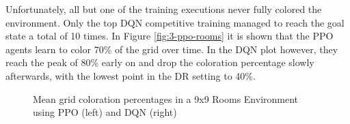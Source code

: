 Unfortunately, all but one of the training executions never fully colored the environment. Only the top DQN competitive training managed to reach the goal state a total of 10 times. In Figure \ref{fig:3-ppo-rooms} it is shown that the PPO agents learn to color 70\% of the grid over time. In the DQN plot however, they reach the peak of 80\% early on and drop the coloration percentage slowly afterwards, with the lowest point in the DR setting to 40\%.  

\begin{figure}[hpbt]
    \centering
    \hspace{0.01\textwidth}
    \caption[Mean Coloration Percentage of the Top Modes in a 9x9 Rooms Environment]{Mean grid coloration percentages in a 9x9 Rooms Environment using PPO (left) and DQN (right)}
    \label{fig:multipic_plots_rooms} 
\end{figure}